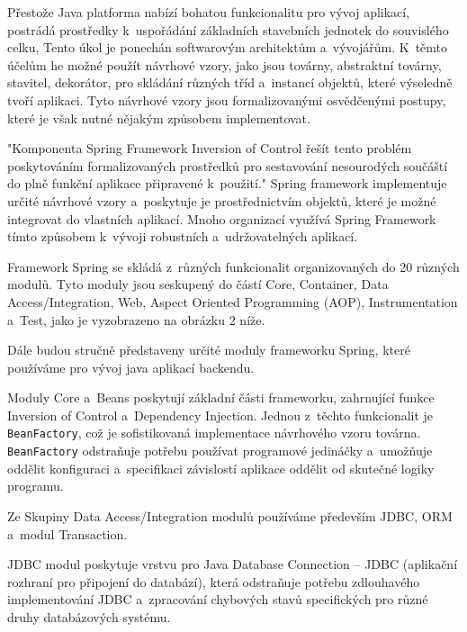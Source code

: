 \documentclass[12pt]{article}
\begin{document}
{%

Přestože Java platforma nabízí bohatou funkcionalitu pro vývoj aplikací,
postrádá prostředky k~uspořádání základních stavebních jednotek do souvislého celku,
Tento úkol je ponechán softwarovým architektům a~vývojářům.
K~těmto účelům he možné použít návrhové vzory, jako jsou továrny, abstraktní továrny,
stavitel, dekorátor, pro skládání různých tříd a~instancí objektů,
které výseledně tvoří aplikaci.
Tyto návrhové vzory jsou formalizovanými osvědčenými postupy,
které je však nutné nějakým způsobem implementovat.

"Komponenta Spring Framework Inversion of Control řešít tento problém
poskytováním formalizovaných prostředků pro sestavování nesourodých
součáští do plně funkční aplikace připravené k~použití."
Spring framework  implementuje určité návrhové vzory a~poskytuje
je prostřednictvím objektů, které je možné integrovat do vlastních aplikací.
Mnoho organizací využívá Spring Framework tímto způsobem k~vývoji robustních
a~udržovatelných aplikací.

Framework Spring se skládá z~různých funkcionalit organizovaných do 20 různých modulů.
Tyto moduly jsou seskupený do částí Core, Container, Data Access/Integration,
Web, Aspect Oriented Programming (AOP), Instrumentation a~Test,
jako je vyzobrazeno na obrázku 2 níže.

\obrazek
{}

Dále budou stručně představeny určité moduly frameworku Spring,
které používáme pro vývoj java aplikací backendu.

Moduly Core a~Beans poskytují základní části frameworku,
zahrnující funkce Inversion of Control a~Dependency Injection.
Jednou z~těchto funkcionalit je \texttt{BeanFactory},
což je sofistikovaná implementace návrhového vzoru továrna.
\texttt{BeanFactory} odstraňuje potřebu používat programové jedináčky a~umožňuje oddělit konfiguraci a~specifikaci závislostí aplikace oddělit 
od skutečné logiky programu.

%
Ze Skupiny Data Access/Integration modulů používáme především JDBC, ORM
a~modul Transaction.

JDBC modul poskytuje vrstvu pro Java Database Connection
-- JDBC (aplikační rozhraní pro připojení do databází), 
která odstraňuje potřebu zdlouhavého implementování JDBC a~zpracování chybových stavů specifických pro různé druhy databázových systému.

}
\end{document}
